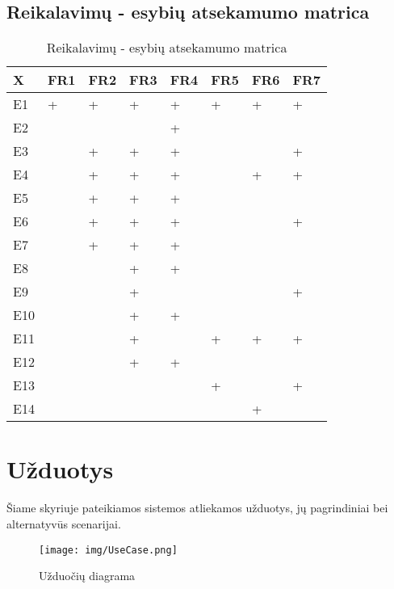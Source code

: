 \documentclass{VUMIFPSkursinis}
\begin{document}
	\subsection{Reikalavimų - esybių atsekamumo matrica}\label{strukturinisDSModelis_matrica}
			\begin{table}[H]\footnotesize
  \centering
  \caption{Reikalavimų - esybių atsekamumo matrica}
  \resizebox{\textwidth}{!}
  {\begin{tabular}{|l| l| l| l| l| l| l| l|} \hline
    	X		& FR1		& FR2		& FR3		& FR4		& FR5		& FR6		& FR7\\
\hline
	E1		&+		&+		&+		&+		&+		&+		&+\\
\hline
	E2		&		&		&		&+		&		&		&\\
\hline
	E3		&		&+		&+		&+		&		&		&+\\
\hline
	E4		&		&+		&+		&+		&		&+		&+\\
\hline
	E5		&		&+		&+		&+		&		&		&\\
\hline
	E6		&		&+		&+		&+		&		&		&+\\
\hline
	E7		&		&+		&+		&+		&		&		&\\
\hline
	E8		&		&		&+		&+		&		&		&\\
\hline
	E9		&		&		&+		&		&		&		&+\\
\hline
	E10		&		&		&+		&+		&		&		&\\
\hline
	E11		&		&		&+		&		&+		&+		&+\\
\hline
	E12		&		&		&+		&+		&		&		&\\
\hline
	E13		&		&		&		&		&+		&		&+\\
\hline
	E14		&		&		&		&		&		&+		&\\
\hline
  \end{tabular}}
  \label{tab:table example}
\end{table}

\section{Užduotys}
	Šiame skyriuje pateikiamos sistemos atliekamos užduotys, jų pagrindiniai bei alternatyvūs scenarijai.
	\begin{figure}[H]
		\centering
		\texttt{[image: img/UseCase.png]}
		\caption{Užduočių diagrama}
		\label{img:psi2-use-case}
	\end{figure}
\end{document}
